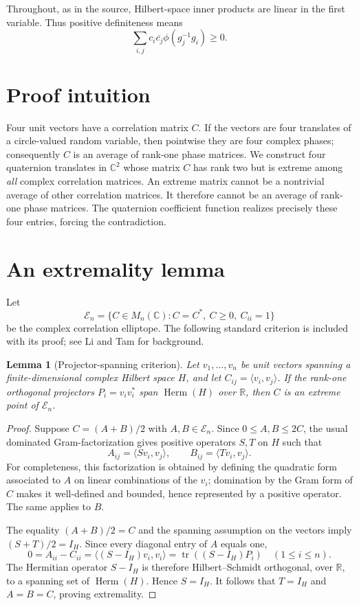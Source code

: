 \documentclass[11pt]{article}
\newtheorem{lemma}{Lemma}
\newcommand{\C}{\mathbb C}
\newcommand{\Herm}{\operatorname{Herm}}
\begin{document}
Throughout, as in the source, Hilbert-space inner products are linear in the
first variable.  Thus positive definiteness means
\[
  \sum_{i,j}c_i\overline{c_j}\phi(g_j^{-1}g_i)\geq0.
\]

\section{Proof intuition}

Four unit vectors have a correlation matrix $C$.  If the vectors are four
translates of a circle-valued random variable, then pointwise they are four
complex phases; consequently $C$ is an average of rank-one phase matrices.
We construct four quaternion translates in $\C^2$ whose matrix $C$ has rank
two but is extreme among \emph{all} complex correlation matrices.  An extreme
matrix cannot be a nontrivial average of other correlation matrices.  It
therefore cannot be an average of rank-one phase matrices.  The quaternion
coefficient function realizes precisely these four entries, forcing the
contradiction.

\section{An extremality lemma}

Let
\[
 \mathcal E_n=\{C\in M_n(\C): C=C^*,\ C\geq0,\ C_{ii}=1\}
\]
be the complex correlation elliptope.  The following standard criterion is
included with its proof; see Li and Tam \cite{LiTam} for background.

\begin{lemma}[Projector-spanning criterion]\label{lem:extreme}
Let $v_1,\dots,v_n$ be unit vectors spanning a finite-dimensional complex
Hilbert space $H$, and let $C_{ij}=\langle v_i,v_j\rangle$.  If the rank-one
orthogonal projectors $P_i=v_iv_i^*$ span $\Herm(H)$ over $\mathbb R$, then
$C$ is an extreme point of $\mathcal E_n$.
\end{lemma}

\begin{proof}
Suppose $C=(A+B)/2$ with $A,B\in\mathcal E_n$.  Since $0\leq A,B\leq2C$,
the usual dominated Gram-factorization gives positive operators $S,T$ on $H$
such that
\[
 A_{ij}=\langle Sv_i,v_j\rangle,
 \qquad B_{ij}=\langle Tv_i,v_j\rangle.
\]
For completeness, this factorization is obtained by defining the quadratic
form associated to $A$ on linear combinations of the $v_i$; domination by the
Gram form of $C$ makes it well-defined and bounded, hence represented by a
positive operator.  The same applies to $B$.

The equality $(A+B)/2=C$ and the spanning assumption on the vectors imply
$(S+T)/2=I_H$.  Since every diagonal entry of $A$ equals one,
\[
 0=A_{ii}-C_{ii}=\langle(S-I_H)v_i,v_i\rangle
   =\operatorname{tr}((S-I_H)P_i)
 \quad(1\leq i\leq n).
\]
The Hermitian operator $S-I_H$ is therefore Hilbert--Schmidt orthogonal, over
$\mathbb R$, to a spanning set of $\Herm(H)$.  Hence $S=I_H$.  It follows that
$T=I_H$ and $A=B=C$, proving extremality.
\end{proof}
\end{document}
